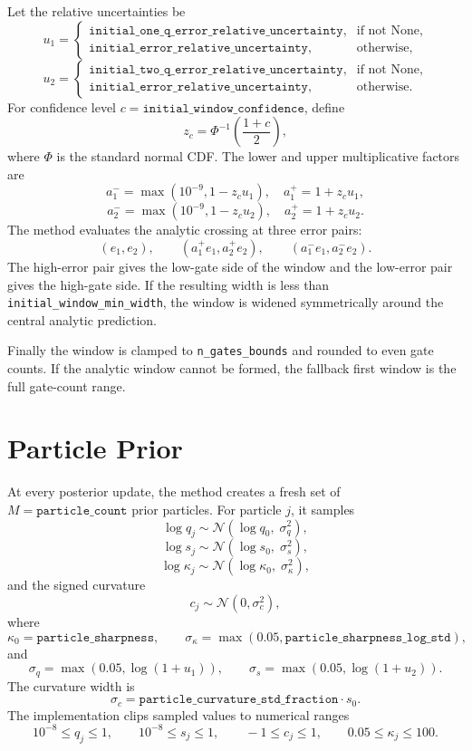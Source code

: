 \documentclass[11pt]{article}
\begin{document}
Let the relative uncertainties be
\[
    u_1 =
    \begin{cases}
    \texttt{initial\_one\_q\_error\_relative\_uncertainty},
    & \text{if not None},\\
    \texttt{initial\_error\_relative\_uncertainty},
    & \text{otherwise},
    \end{cases}
\]
\[
    u_2 =
    \begin{cases}
    \texttt{initial\_two\_q\_error\_relative\_uncertainty},
    & \text{if not None},\\
    \texttt{initial\_error\_relative\_uncertainty},
    & \text{otherwise}.
    \end{cases}
\]
For confidence level $c=\texttt{initial\_window\_confidence}$, define
\[
    z_c = \Phi^{-1}\left(\frac{1+c}{2}\right),
\]
where $\Phi$ is the standard normal CDF. The lower and upper multiplicative
factors are
\[
    a_1^-=\max(10^{-9},1-z_c u_1), \quad
    a_1^+=1+z_c u_1,
\]
\[
    a_2^-=\max(10^{-9},1-z_c u_2), \quad
    a_2^+=1+z_c u_2.
\]
The method evaluates the analytic crossing at three error pairs:
\[
    (e_1,e_2), \qquad (a_1^+e_1,a_2^+e_2),
    \qquad (a_1^-e_1,a_2^-e_2).
\]
The high-error pair gives the low-gate side of the window and the low-error
pair gives the high-gate side. If the resulting width is less than
\texttt{initial\_window\_min\_width}, the window is widened symmetrically
around the central analytic prediction.

Finally the window is clamped to \texttt{n\_gates\_bounds} and rounded to even
gate counts. If the analytic window cannot be formed, the fallback first
window is the full gate-count range.

\section{Particle Prior}

At every posterior update, the method creates a fresh set of
$M=\texttt{particle\_count}$ prior particles. For particle $j$, it samples
\[
    \log q_j \sim
    \mathcal{N}\left(
        \log q_0,\;
        \sigma_q^2
    \right),
\]
\[
    \log s_j \sim
    \mathcal{N}\left(
        \log s_0,\;
        \sigma_s^2
    \right),
\]
\[
    \log \kappa_j \sim
    \mathcal{N}\left(
        \log \kappa_0,\;
        \sigma_\kappa^2
    \right),
\]
and the signed curvature
\[
    c_j \sim \mathcal{N}(0,\sigma_c^2),
\]
where
\[
    \kappa_0=\texttt{particle\_sharpness},
    \qquad
    \sigma_\kappa =
    \max(0.05,\texttt{particle\_sharpness\_log\_std}),
\]
and
\[
    \sigma_q=\max(0.05,\log(1+u_1)),
    \qquad
    \sigma_s=\max(0.05,\log(1+u_2)).
\]
The curvature width is
\[
    \sigma_c =
    \texttt{particle\_curvature\_std\_fraction}\cdot s_0.
\]
The implementation clips sampled values to numerical ranges
\[
    10^{-8}\le q_j\le 1,\qquad
    10^{-8}\le s_j\le 1,\qquad
    -1\le c_j\le 1,\qquad
    0.05\le \kappa_j\le 100.
\]
\end{document}
